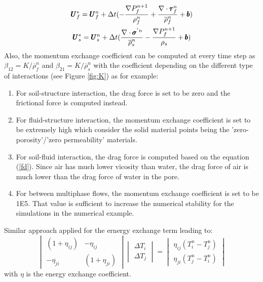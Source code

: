 \documentclass[preprint,12pt]{elsarticle}
\begin{document}
%
\begin{equation}
\begin{gathered}
\pmb{U}_{f}^{*} = \pmb{U}_{f}^{n} + \Delta{t} (-\frac{\nabla P_{f}^{n+1}}{\rho_f^n}  + \frac {\nabla \cdot \pmb{\tau}_f^{n}}{\overline{\rho}^n_{f}} + \pmb{b}) \\
\pmb{U}_{s}^{*} = \pmb{U}_{s}^{n} + \Delta{t} (\frac{\nabla \cdot \pmb{\sigma}^{'n}}{\overline{\rho}^n_{s}}    - \frac{\nabla P_{f}^{n+1}}{\rho_s}  + \pmb{b})
\end {gathered}
\end {equation}
%
%
Also, the momentum exchange coefficient can be computed at every time step as $\beta_{12} = K/\overline{\rho}_{f}^n$ and $\beta_{21} = K/\overline{\rho}_{s}^n$ with the coefficient depending on the different type of interactions (see Figure \ref{fig:K}) as for example: \\
\begin{enumerate}
\item For soil-structure interaction, the drag force is set to be zero and the frictional force is computed instead.
\item For fluid-structure interaction, the momentum exchange coefficient is set to be extremely high which consider the solid material points being the 'zero-porosity'/'zero permeability' materials.
\item For soil-fluid interaction, the drag force is computed based on the equation (\ref{fd}). Since air has much lower vicosity than water, the drag force of air is much lower than the drag force of water in the pore.
\item For between multiphase flows, the momentum exchange coefficient is set to be 1E5. That value is sufficient to increase the numerical stability for the simulations in the numerical example.
\end {enumerate}
Similar approach applied for the ernergy exchange term leading to:
%
%
\[ \begin{vmatrix} (1 + \eta_{ij})  &  -\eta_{ij} \\
                  -\eta_{ji}       &  (1 + \eta_{ji})
    \end {vmatrix}
    \begin{vmatrix} \Delta T_{i} \\
                    \Delta T_{j}
    \end {vmatrix}
    =
    \begin{vmatrix}  \eta_{ij}(T_{i}^{n} - T_{j}^{n}) \\
                    \eta_{ji}(T_{j}^{n} - T_i^{n})
    \end {vmatrix}                
\]
with $\eta$ is the energy exchange coefficient.\\
\end{document}
